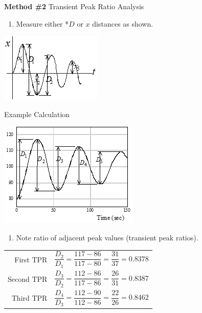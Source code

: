 \documentclass[
]{book}
\providecommand{\tightlist}{%
  \setlength{\itemsep}{0pt}\setlength{\parskip}{0pt}}
\begin{document}
\textbf{Method \#2} Transient Peak Ratio Analysis

\begin{enumerate}
\def\labelenumi{\arabic{enumi}.}
\tightlist
\item
  Measure either *\(D\) or \(x\) distances as shown.
\end{enumerate}

\includegraphics{media/08/image67.png}

Example Calculation

\includegraphics{media/08/image68.png}

\begin{enumerate}
\def\labelenumi{\arabic{enumi}.}
\setcounter{enumi}{1}
\tightlist
\item
  Note ratio of adjacent peak values (transient peak ratios).
\end{enumerate}

\begin{longtable}[]{@{}rl@{}}
\toprule
\endhead
\begin{minipage}[t]{0.31\columnwidth}\raggedleft
First \(\mathrm{TPR}\)\strut
\end{minipage} & \begin{minipage}[t]{0.63\columnwidth}\raggedright
\[\frac{D_2}{D_1} = \frac{117-86}{117-80}=\frac{31}{37}=0.8378\]\strut
\end{minipage}\tabularnewline
\begin{minipage}[t]{0.31\columnwidth}\raggedleft
Second \(\mathrm{TPR}\)\strut
\end{minipage} & \begin{minipage}[t]{0.63\columnwidth}\raggedright
\[\frac{D_3}{D_2} = \frac{112-86}{117-86}=\frac{26}{31}=0.8387\]\strut
\end{minipage}\tabularnewline
\begin{minipage}[t]{0.31\columnwidth}\raggedleft
Third \(\mathrm{TPR}\)\strut
\end{minipage} & \begin{minipage}[t]{0.63\columnwidth}\raggedright
\[\frac{D_4}{D_3} = \frac{112-90}{112-86}=\frac{22}{26}=0.8462\]\strut
\end{minipage}\tabularnewline
\bottomrule
\end{longtable}
\end{document}
